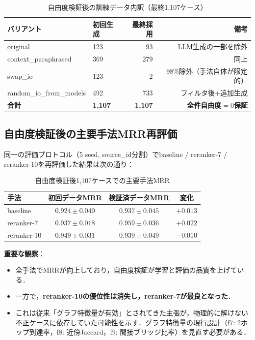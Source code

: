 \documentclass[11pt,a4paper]{ltjsarticle}
\begin{document}
\begin{table}[h]
\centering
\caption{自由度検証後の訓練データ内訳（最終1{,}107ケース）}
\begin{tabular}{llrr}
\toprule
バリアント & 初回生成 & 最終採用 & 備考 \\
\midrule
original & 123 & 93 & LLM生成の一部を除外 \\
context\_paraphrased & 369 & 279 & 同上 \\
swap\_io & 123 & 2 & 98\%除外（手法自体が限定的） \\
random\_io\_from\_models & 492 & 733 & フィルタ後+追加生成 \\
\midrule
\textbf{合計} & \textbf{1{,}107} & \textbf{1{,}107} & \textbf{全件自由度$=0$保証} \\
\bottomrule
\end{tabular}
\end{table}

\subsection{自由度検証後の主要手法MRR再評価}

同一の評価プロトコル（5 seed, source\_id分割）でbaseline / reranker-7 / reranker-10を再評価した結果は次の通り：

\begin{table}[h]
\centering
\caption{自由度検証後1{,}107ケースでの主要手法MRR}
\begin{tabular}{lccc}
\toprule
手法 & 初回データMRR & 検証済データMRR & 変化 \\
\midrule
baseline & $0.924 \pm 0.040$ & $0.937 \pm 0.045$ & $+0.013$ \\
reranker-7 & $0.937 \pm 0.018$ & $\mathbf{0.959 \pm 0.036}$ & $+0.022$ \\
reranker-10 & $\mathbf{0.949 \pm 0.031}$ & $0.939 \pm 0.049$ & $-0.010$ \\
\bottomrule
\end{tabular}
\end{table}

\textbf{重要な観察}：
\begin{itemize}[leftmargin=2em, nosep]
  \item 全手法でMRRが向上しており，自由度検証が学習と評価の品質を上げている．
  \item 一方で，\textbf{reranker-10の優位性は消失し，reranker-7が最良となった}．
  \item これは従来「グラフ特徴量が有効」とされてきた主張が，物理的に解けない不正ケースに依存していた可能性を示す．グラフ特徴量の現行設計（f7: 2ホップ到達率，f8: 近傍Jaccard，f9: 間接ブリッジ比率）を見直す必要がある．
\end{itemize}
\end{document}
